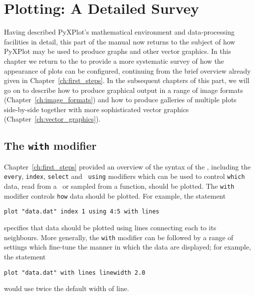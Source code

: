 %
%
%
%
%



\chapter{Plotting: A Detailed Survey}
\label{ch:plotting}

Having described PyXPlot's mathematical environment and data-processing
facilities in detail, this part of the manual now returns to the subject of how
PyXPlot may be used to produce graphs and other vector graphics. In this
chapter we return to the  to provide a more systematic survey of
how the appearance of plots can be configured, continuing from the brief
overview already given in Chapter~\ref{ch:first_steps}.  In the subsequent
chapters of this part, we will go on to describe how to produce graphical
output in a range of image formats (Chapter~\ref{ch:image_formats}) and how to
produce galleries of multiple plots side-by-side together with more
sophisticated vector graphics (Chapter~\ref{ch:vector_graphics}).

\section{The {\tt with} modifier}

Chapter~\ref{ch:first_steps} provided an overview of the syntax of the
, including the {\tt every}, {\tt index}, {\tt select} and {\tt
using} modifiers which can be used to control {\tt which} data, read from a
\datafile\ or sampled from a function, should be plotted. The {\tt with}
modifier controls {\tt how} data should be plotted. For example, the statement
\begin{verbatim}
plot "data.dat" index 1 using 4:5 with lines
\end{verbatim}
specifies that data should be plotted using lines connecting each \datapoint to
its neighbours. More generally, the {\tt with} modifier can be followed by a
range of settings which fine-tune the manner in which the data are displayed;
for example, the statement
\begin{verbatim}
plot "data.dat" with lines linewidth 2.0
\end{verbatim}
would use twice the default width of line.

